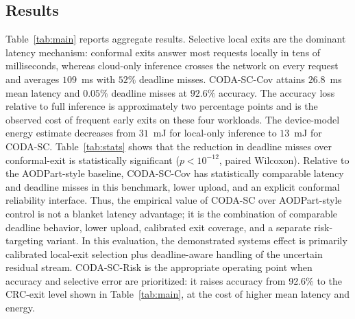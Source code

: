 \documentclass[11pt]{article}
\newcommand{\CodaMean}{26.8}
\newcommand{\CodaPmiss}{0.05}
\newcommand{\CodaEnergyMJ}{13}
\newcommand{\CodaAcc}{92.6}
\newcommand{\CloudMean}{109}
\newcommand{\CloudPmiss}{52}
\newcommand{\LocalEnergyMJ}{31}
\begin{document}
\subsection{Results}

Table~\ref{tab:main} reports aggregate results. Selective local exits are the
dominant latency mechanism: conformal exits answer most requests locally in tens
of milliseconds, whereas cloud-only inference crosses the network on every
request and averages $\CloudMean$~ms with $\CloudPmiss\%$ deadline misses.
CODA-SC-Cov attains $\CodaMean$~ms mean latency and $\CodaPmiss\%$ deadline
misses at $\CodaAcc\%$ accuracy. The accuracy loss relative to full inference is
approximately two percentage points and is the observed cost of frequent early
exits on these four workloads. The device-model energy estimate decreases from
$\LocalEnergyMJ$~mJ for local-only inference to $\CodaEnergyMJ$~mJ for CODA-SC.
Table~\ref{tab:stats} shows that the reduction in deadline misses over
conformal-exit is statistically significant ($p<10^{-12}$, paired Wilcoxon).
Relative to the AODPart-style baseline, CODA-SC-Cov has statistically comparable
latency and deadline misses in this benchmark, lower upload, and an explicit
conformal reliability interface. Thus, the empirical value of CODA-SC over
AODPart-style control is not a blanket latency advantage; it is the combination
of comparable deadline behavior, lower upload, calibrated exit coverage, and a
separate risk-targeting variant. In this evaluation, the demonstrated systems
effect is primarily calibrated local-exit selection plus deadline-aware handling
of the uncertain residual stream. CODA-SC-Risk is the appropriate operating
point when accuracy and selective error are prioritized: it raises accuracy from
\CodaAcc\% to the CRC-exit level shown in Table~\ref{tab:main}, at the cost of
higher mean latency and energy.
\end{document}
